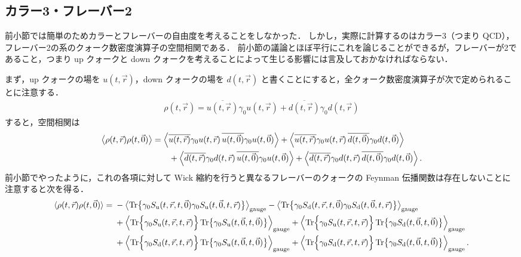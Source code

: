 \documentclass[dvipdfmx, a4paper]{jarticle}
\numberwithin{equation}{section}
\begin{document}
\subsection{カラー3・フレーバー2}
前小節では簡単のためカラーとフレーバーの自由度を考えることをしなかった．
しかし，実際に計算するのはカラー3（つまり QCD），フレーバー2の系のクォーク数密度演算子の空間相関である．
前小節の議論とほぼ平行にこれを論じることができるが，フレーバーが2であること，つまり up クォークと down クォークを考えることによって生じる影響には言及しておかなければならない．

まず，up クォークの場を $u(t, \vec{r})$，down クォークの場を $d(t, \vec{r})$ と書くことにすると，全クォーク数密度演算子が次で定められることに注意する．
\begin{align}
  \rho(t, \vec{r}) = \overline{u(t, \vec{r})} \gamma_0 u(t, \vec{r}) + \overline{d(t, \vec{r})} \gamma_0 d(t, \vec{r})
\end{align}
すると，空間相関は
\begin{align}
  \ev{\rho(t, \vec{r})\rho(t, \vec{0})} 
  &= \left\langle
  \overline{u(t,\vec r)}\gamma_0 u(t,\vec r)\,
  \overline{u(t,\vec 0)}\gamma_0 u(t,\vec 0)
  \right\rangle
  +
  \left\langle
  \overline{u(t,\vec r)}\gamma_0 u(t,\vec r)\,
  \overline{d(t,\vec 0)}\gamma_0 d(t,\vec 0)
  \right\rangle
  \notag\\
  &\quad\quad+
  \left\langle
  \overline{d(t,\vec r)}\gamma_0 d(t,\vec r)\,
  \overline{u(t,\vec 0)}\gamma_0 u(t,\vec 0)
  \right\rangle
  +
  \left\langle
  \overline{d(t,\vec r)}\gamma_0 d(t,\vec r)\,
  \overline{d(t,\vec 0)}\gamma_0 d(t,\vec 0)
  \right\rangle .
\end{align}
前小節でやったように，これの各項に対して Wick 縮約を行うと異なるフレーバーのクォークの Feynman 伝播関数は存在しないことに注意すると次を得る．
\begin{align}
    \langle \rho(t, \vec{r})\rho(t, \vec{0})\rangle
  ={}&
  -\left\langle
  \operatorname{Tr}\!\left\{
  \gamma_0 S_\mathrm{u}(t, \vec{r},t, \vec{0})\gamma_0 S_\mathrm{u}(t, \vec{0},t, \vec{r})
  \right\}
  \right\rangle_\mathrm{gauge}
  -
  \left\langle
  \operatorname{Tr}\!\left\{
  \gamma_0 S_\mathrm{d}(t, \vec{r},t, \vec{0})\gamma_0 S_\mathrm{d}(t, \vec{0},t, \vec{r})
  \right\}
  \right\rangle_\mathrm{gauge}
  \notag\\
  &+
  \left\langle
  \operatorname{Tr}\!\Big\{\gamma_0 S_\mathrm{u}(t, \vec{r},t, \vec{r})\Big\}
  \operatorname{Tr}\!\left\{\gamma_0 S_\mathrm{u}(t, \vec{0},t, \vec{0})\right\}
  \right\rangle_\mathrm{gauge}
  +
  \left\langle
  \operatorname{Tr}\!\Big\{\gamma_0 S_\mathrm{u}(t, \vec{r},t, \vec{r})\Big\}
  \operatorname{Tr}\!\left\{\gamma_0 S_\mathrm{d}(t, \vec{0},t, \vec{0})\right\}
  \right\rangle_\mathrm{gauge}
  \notag\\
  &+
  \left\langle
  \operatorname{Tr}\!\Big\{\gamma_0 S_\mathrm{d}(t, \vec{r},t, \vec{r})\Big\}
  \operatorname{Tr}\!\left\{\gamma_0 S_\mathrm{u}(t, \vec{0},t, \vec{0})\right\}
  \right\rangle_\mathrm{gauge}
  +
  \left\langle
  \operatorname{Tr}\!\Big\{\gamma_0 S_\mathrm{d}(t, \vec{r},t, \vec{r})\Big\}
  \operatorname{Tr}\!\left\{\gamma_0 S_\mathrm{d}(t, \vec{0},t, \vec{0})\right\}
  \right\rangle_\mathrm{gauge}.
\end{align}
\end{document}
